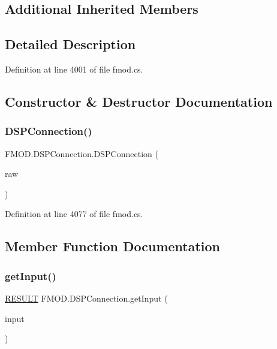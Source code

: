 \subsection*{Additional Inherited Members}


\subsection{Detailed Description}


Definition at line 4001 of file fmod.\+cs.



\subsection{Constructor \& Destructor Documentation}
\mbox{\label{class_f_m_o_d_1_1_d_s_p_connection_a29b71c3c0823f0f938f31a38192b8f4f}} 
\subsubsection{\texorpdfstring{D\+S\+P\+Connection()}{DSPConnection()}}
{\footnotesize\ttfamily F\+M\+O\+D.\+D\+S\+P\+Connection.\+D\+S\+P\+Connection (\begin{DoxyParamCaption}\item[{Int\+Ptr}]{raw }\end{DoxyParamCaption})}



Definition at line 4077 of file fmod.\+cs.



\subsection{Member Function Documentation}
\mbox{\label{class_f_m_o_d_1_1_d_s_p_connection_a8c5c863bba5e01ca67f5269b2d97c3a9}} 
\subsubsection{\texorpdfstring{get\+Input()}{getInput()}}
{\footnotesize\ttfamily \hyperlink{namespace_f_m_o_d_a305d1176ef3f8c8815861a60407ac33d}{R\+E\+S\+U\+LT} F\+M\+O\+D.\+D\+S\+P\+Connection.\+get\+Input (\begin{DoxyParamCaption}\item[{out \hyperlink{class_f_m_o_d_1_1_d_s_p}{D\+SP}}]{input }\end{DoxyParamCaption})}



